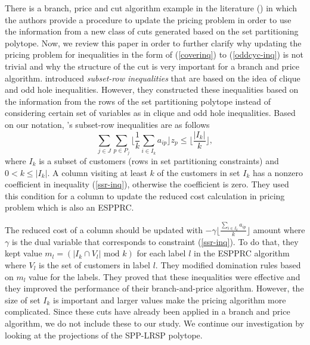 There is a branch, price and cut algorithm example in the literature
(\citet{Jepsen}) in which the authors provide a procedure to update
the pricing problem in order to use the information from a new class
of cuts generated based on the set partitioning polytope. Now, we
review this paper in order to further clarify why updating the
pricing problem for inequalities in the form of (\ref{coverinq}) to
(\ref{oddcyc-inq}) is not trivial and why the structure of the cut is
very important for a branch and price algorithm.
\citet{Jepsen} introduced {\em subset-row inequalities} that are
based on the idea of clique and odd hole inequalities. However, they
constructed these inequalities based on the information from the
rows of the set partitioning polytope instead of considering certain
set of variables as in clique and odd hole inequalities. Based on
our notation, \citet{Jepsen}'s subset-row inequalities are as follows
\begin{equation}
\sum_{j \in J}\sum_{p \in P_j}\Big\lfloor \frac{1}{k} \sum_{i \in I_k}a_{ip} \Big\rfloor z_{p} \leq \Big\lfloor \frac{|I_k|}{k} \Big\rfloor, \label{ssr-inq}
\end{equation}
where $I_k$ is a subset of customers (rows in set partitioning
constraints) and $0 < k \leq |I_k|$. A column visiting at least $k$
of the customers in set $I_k$ has a nonzero coefficient in
inequality (\ref{ssr-inq}), otherwise the coefficient is zero. They
used this condition for a column to update the reduced cost
calculation in pricing problem which is also an ESPPRC.

The reduced cost of a column should be updated with $-\gamma \Big\lfloor \frac{\sum_{i \in
I_k}a_{ip}}{k}\Big\rfloor $ amount where $\gamma$ is the dual variable
that corresponds to constraint (\ref{ssr-inq}).
To do that, they kept value $m_l = (|I_k \cap V_l| \mbox{ mod } k)$
for each label $l$ in the ESPPRC algorithm where $V_l$ is the set
of customers in label $l$. They modified domination rules based on
$m_l$ value for the labels. They proved that these inequalities were
effective and they improved the performance of their branch-and-price
algorithm. However, the size of set $I_k$ is important and larger values
make the pricing algorithm more complicated. Since these cuts have already
been applied in a branch and price algorithm, we do not include these to
our study. We continue our investigation by looking at the projections
of the SPP-LRSP polytope.

